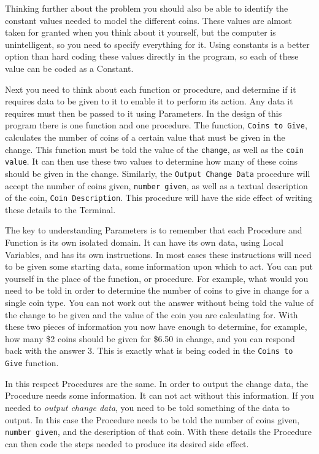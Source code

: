 Thinking further about the problem you should also be able to identify the constant values needed to model the different coins. These values are almost taken for granted when you think about it yourself, but the computer is unintelligent, so you need to specify everything for it. Using constants is a better option than hard coding these values directly in the program, so each of these value can be coded as a Constant.

Next you need to think about each function or procedure, and determine if it requires data to be given to it to enable it to perform its action. Any data it requires must then be passed to it using Parameters. In the design of this program there is one function and one procedure. The function, \texttt{Coins to Give}, calculates the number of coins of a certain value that must be given in the change. This function must be told the value of the \texttt{change}, as well as the \texttt{coin value}. It can then use these two values to determine how many of these coins should be given in the change. Similarly, the \texttt{Output Change Data} procedure will accept the number of coins given, \texttt{number given}, as well as a textual description of the coin, \texttt{Coin Description}. This procedure will have the side effect of writing these details to the Terminal.

The key to understanding Parameters is to remember that each Procedure and Function is its own isolated domain. It can have its own data, using Local Variables, and has its own instructions. In most cases these instructions will need to be given some starting data, some information upon which to act. You can put yourself in the place of the function, or procedure. For example, what would you need to be told in order to determine the number of coins to give in change for a single coin type. You can not work out the answer without being told the value of the change to be given and the value of the coin you are calculating for. With these two pieces of information you now have enough to determine, for example, how many \$2 coins should be given for \$6.50 in change, and you can respond back with the answer 3. This is exactly what is being coded in the \texttt{Coins to Give} function.

In this respect Procedures are the same. In order to output the change data, the Procedure needs some information. It can not act without this information. If you needed to \emph{output change data}, you need to be told something of the data to output. In this case the Procedure needs to be told the number of coins given, \texttt{number given}, and the description of that coin. With these details the Procedure can then code the steps needed to produce its desired side effect.

